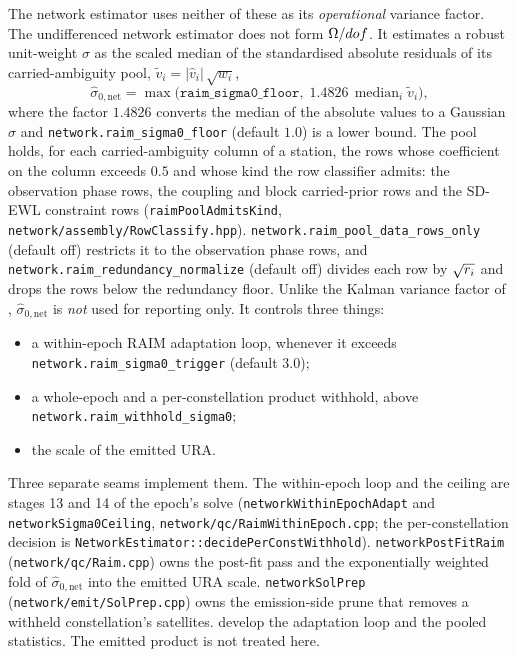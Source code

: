 \documentclass[main.tex]{subfiles}
\begin{document}
The network estimator uses neither of these as its \emph{operational}
variance factor.  The undifferenced network estimator does not form
$\Omega/dof$.  It estimates a robust unit-weight $\sigma$ as the scaled
median of the standardised absolute residuals of its carried-ambiguity pool,
$\tilde v_i = |\hat v_i|\,\sqrt{w_i}$,
\begin{equation}
\hat\sigma_{0,\mathrm{net}}
  = \max\!\bigl(\texttt{raim\_sigma0\_floor},\;
                1.4826\,\operatorname{median}_i \tilde v_i\bigr),
\label{eq:qc-sigma0-net}
\end{equation}
where the factor $1.4826$ converts the median of the absolute values to a
Gaussian $\sigma$ and \texttt{network.raim\_sigma0\_floor} (default $1.0$) is a
lower bound.  The pool holds, for each carried-ambiguity column of a station,
the rows whose coefficient on the column exceeds $0.5$ and whose kind the row
classifier admits: the observation phase rows, the coupling and block
carried-prior rows and the SD-EWL constraint rows
(\texttt{raimPoolAdmitsKind}, \texttt{network/assembly/RowClassify.hpp}).
\texttt{network.raim\_pool\_data\_rows\_only} (default off) restricts it to the
observation phase rows, and \texttt{network.raim\_redundancy\_normalize}
(default off) divides each row by $\sqrt{r_i}$ and drops the rows below
the redundancy floor.  Unlike the Kalman variance factor of
, $\hat\sigma_{0,\mathrm{net}}$ is \emph{not} used for
reporting only.  It controls three things:
\begin{itemize}[leftmargin=*]
\item a within-epoch RAIM adaptation loop, whenever it exceeds
      \texttt{network.raim\_sigma0\_trigger} (default $3.0$);
\item a whole-epoch and a per-constellation product withhold, above
      \texttt{network.raim\_withhold\_sigma0};
\item the scale of the emitted URA.
\end{itemize}
Three separate seams implement them.  The within-epoch loop and the ceiling are
stages 13 and 14 of the epoch's solve (\texttt{networkWithinEpochAdapt} and
\texttt{networkSigma0Ceiling}, \texttt{network/qc/RaimWithinEpoch.cpp}; the
per-constellation decision is
\texttt{NetworkEstimator::decidePerConstWithhold}).
\texttt{networkPostFitRaim} (\texttt{network/qc/Raim.cpp}) owns the
post-fit pass and the exponentially weighted fold of
$\hat\sigma_{0,\mathrm{net}}$ into the emitted URA scale.
\texttt{networkSolPrep} (\texttt{network/emit/SolPrep.cpp}) owns the
emission-side prune that removes a withheld constellation's satellites.
 develop the adaptation
loop and the pooled statistics.  The emitted product is not treated
here.
\end{document}

